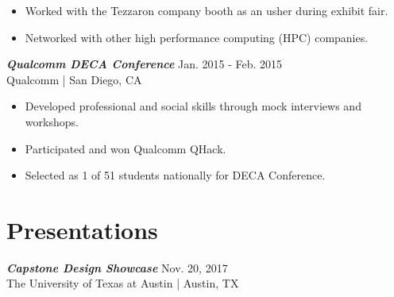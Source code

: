 \documentclass[letter]{res}
\begin{document}
\begin{resume}
 \begin{itemize}
 \item Worked with the Tezzaron company booth as an usher during exhibit fair.
 \item Networked with other high performance computing (HPC) companies.
 \end{itemize}
 
\vspace{-2mm}

{\sl \textbf{Qualcomm DECA Conference}} \hfill Jan. 2015 - Feb. 2015\\
Qualcomm | San Diego, CA \newline

 \vspace{-4mm}

 \begin{itemize}
 \item Developed professional and social skills through mock interviews and workshops.
 \item Participated and won Qualcomm QHack.
 \item Selected as 1 of 51 students nationally for DECA Conference.
 \end{itemize}
 
\vspace{-2mm}
 



 
 

\section{Presentations}
{\sl \textbf{Capstone Design Showcase}} \hfill Nov. 20, 2017\\
The University of Texas at Austin | Austin, TX \newline


\end{resume}
\end{document}
